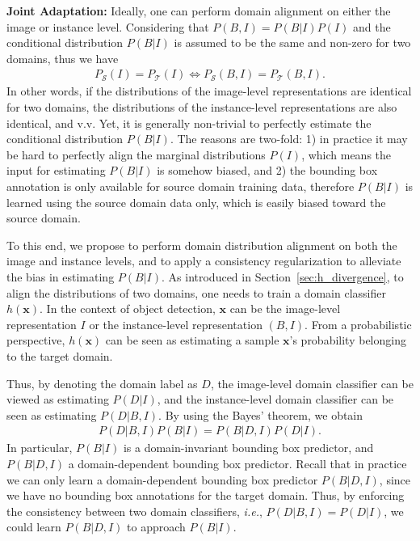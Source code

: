 \documentclass[10pt,twocolumn,letterpaper]{article}
\def\ie{\emph{i.e.}}
\def\cS{\mathcal{S}}
\def\cT{\mathcal{T}}
\def\x{\mathbf{x}}
\begin{document}
\textbf{Joint Adaptation: } Ideally, one can perform domain alignment on either the image or instance level. Considering that $P(B,I) = P(B|I)P(I)$ and the conditional distribution $P(B|I)$ is assumed to be the same and non-zero for two domains, thus we have
\begin{eqnarray}
P_{\cS}(I) = P_{\cT}(I) \Leftrightarrow P_{\cS}(B, I) = P_{\cT}(B, I).
\end{eqnarray}
In other words, if the distributions of the image-level representations are identical for two domains, the distributions of the instance-level representations are also identical, and v.v. Yet, it is generally non-trivial to perfectly estimate the conditional distribution $P(B|I)$. The reasons are two-fold: 1) in practice it may be hard to perfectly align the marginal distributions $P(I)$, which means the input for estimating $P(B|I)$ is somehow biased, and 2) the bounding box annotation is only available for source domain training data, therefore $P(B|I)$ is learned using the source domain data only, which is easily biased toward the source domain.

To this end, we propose to perform domain distribution alignment on both the image and instance levels, and to apply a consistency regularization to alleviate the bias in estimating $P(B|I)$. As introduced in Section~\ref{sec:h_divergence}, to align the distributions of two domains, one needs to train a domain classifier $h(\x)$. In the context of object detection, $\x$ can be the image-level representation $I$ or the instance-level representation $(B, I)$. From a probabilistic perspective, $h(\x)$ can be seen as estimating a sample $\x$'s probability belonging to the target domain. 

Thus, by denoting the domain label as $D$, the image-level domain classifier can be viewed as estimating $P(D|I)$, and the instance-level domain classifier can be seen as estimating $P(D|B, I)$.  By using the Bayes' theorem, we obtain
\begin{eqnarray}
P(D|B, I)P(B|I) = P(B|D, I)P(D|I). 
\label{eqn:joint_condition}
\end{eqnarray}
In particular, $P(B|I)$ is a domain-invariant bounding box predictor, and $P(B|D, I)$ a domain-dependent bounding box predictor. Recall that in practice we can only learn a domain-dependent bounding box predictor $P(B|D, I)$, since we have no bounding box annotations for the target domain. Thus, by enforcing the consistency between two domain classifiers, \ie,  $P(D|B, I) =  P(D|I)$, we could learn $P(B|D, I)$ to approach $P(B|I)$.
\end{document}
